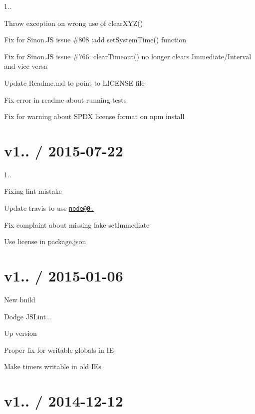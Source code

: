 \begin{DoxyItemize}
\item 1..
\item Throw exception on wrong use of clear\+X\+Y\+Z()
\item Fix for Sinon.\+JS issue \#808 \+:add set\+System\+Time() function
\item Fix for Sinon.\+JS issue \#766\+: clear\+Timeout() no longer clears Immediate/\+Interval and vice versa
\item Update Readme.\+md to point to L\+I\+C\+E\+N\+SE file
\item Fix error in readme about running tests
\item Fix for warning about S\+P\+DX license format on npm install
\end{DoxyItemize}

\section*{v1.. / 2015-\/07-\/22 }


\begin{DoxyItemize}
\item 1..
\item Fixing lint mistake
\item Update travis to use \href{mailto:node@0.12}{\tt node@0.}
\item Fix complaint about missing fake set\+Immediate
\item Use license in package.\+json
\end{DoxyItemize}

\section*{v1.. / 2015-\/01-\/06 }


\begin{DoxyItemize}
\item New build
\item Dodge J\+S\+Lint...
\item Up version
\item Proper fix for writable globals in IE
\item Make timers writable in old I\+Es
\end{DoxyItemize}

\section*{v1.. / 2014-\/12-\/12 }


